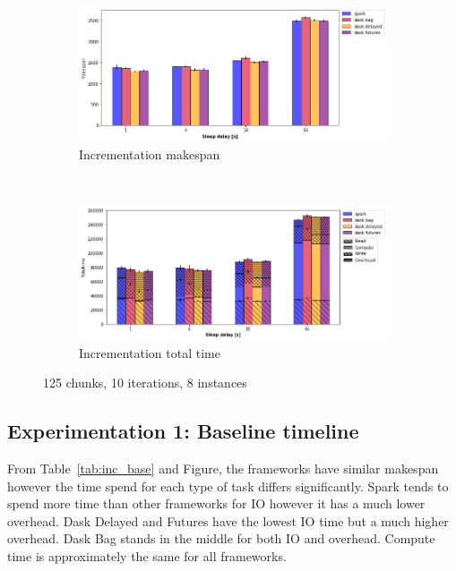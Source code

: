 \documentclass[conference]{IEEEtran}
\begin{document}
\begin{figure}[!b]
    \centering
    \begin{subfigure}[b]{\columnwidth}
        \includegraphics[clip,width=\columnwidth]{images/inc_sleep.png}%
        \caption{Incrementation makespan}\label{fig:inc_ms_sleep}
    \end{subfigure}
    \\
    \begin{subfigure}[b]{\columnwidth}
        \includegraphics[clip,width=\columnwidth]{images/inc_idle_sleep.png}%
        \caption{Incrementation total time}\label{fig:inc_tt_sleep}
    \end{subfigure}
    \caption{125 chunks, 10 iterations, 8 instances}
\end{figure}

\subsection{Experimentation 1: Baseline timeline}
From Table~\ref{tab:inc_base} and Figure, the frameworks have
similar makespan however the time spend for each type of task differs significantly.
Spark tends to spend more time than other frameworks for IO however it has a much
lower overhead. Dask Delayed and Futures have the lowest IO time but a much higher
overhead. Dask Bag stands in the middle for both IO and overhead. Compute time is
approximately the same for all frameworks.
\end{document}
